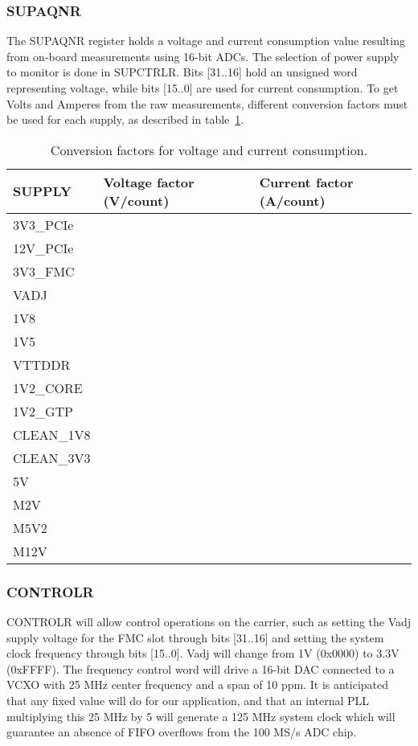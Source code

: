 \documentclass{article}
\begin{document}
\subsubsection{SUPAQNR}
The SUPAQNR register holds a voltage and current consumption value resulting from on-board measurements using 16-bit ADCs. The selection of power supply to monitor is done in SUPCTRLR. Bits [31..16] hold an unsigned word representing voltage, while bits [15..0] are used for current consumption. To get Volts and Amperes from the raw measurements, different conversion factors must be used for each supply, as described in table~\ref{tab:conv_fact}.

\begin{table}[htbp]
  \centering
  \begin{tabularx}{\textwidth}{|X|l|l|}
    \hline
    \textbf{SUPPLY} & \textbf{Voltage factor (V/count)} & \textbf{Current factor (A/count)} \\
    \hline
    \hline
    3V3\_PCIe & & \\
    \hline
    12V\_PCIe & & \\
    \hline
    3V3\_FMC & & \\
    \hline
    VADJ & & \\
    \hline
    1V8 & & \\
    \hline
    1V5 & & \\
    \hline
    VTTDDR & & \\
    \hline
    1V2\_CORE & & \\
    \hline
    1V2\_GTP & & \\
    \hline
    CLEAN\_1V8 & & \\
    \hline
    CLEAN\_3V3 & & \\
    \hline
    5V & & \\
    \hline
    M2V & & \\
    \hline
    M5V2 & & \\
    \hline
    M12V & & \\
    \hline
  \end{tabularx}
  \caption{Conversion factors for voltage and current consumption.}
  \label{tab:conv_fact}
\end{table}

\subsubsection{CONTROLR}
CONTROLR will allow control operations on the carrier, such as setting the Vadj supply voltage for the FMC slot through bits [31..16] and setting the system clock frequency through bits [15..0]. Vadj will change from 1V (0x0000) to 3.3V (0xFFFF). The frequency control word will drive a 16-bit DAC connected to a VCXO with 25 MHz center frequency and a span of 10 ppm. It is anticipated that any fixed value will do for our application, and that an internal PLL multiplying this 25 MHz by 5 will generate a 125 MHz system clock which will guarantee an absence of FIFO overflows from the 100 MS/s ADC chip.
\end{document}
